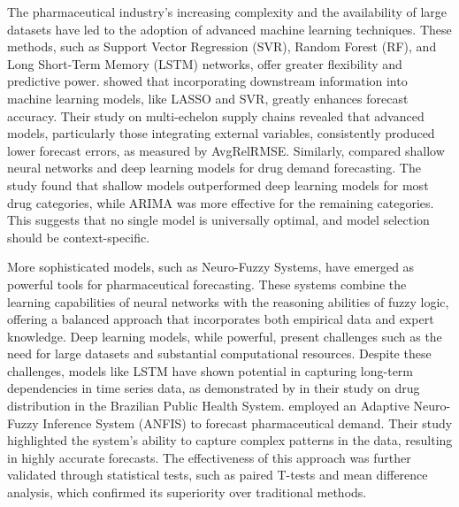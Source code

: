\documentclass[
  authoryear,
  preprint,
  3p]{elsarticle}
\begin{document}
The pharmaceutical industry's increasing complexity and the availability
of large datasets have led to the adoption of advanced machine learning
techniques. These methods, such as Support Vector Regression (SVR),
Random Forest (RF), and Long Short-Term Memory (LSTM) networks, offer
greater flexibility and predictive power. \citet{van2021using} showed
that incorporating downstream information into machine learning models,
like LASSO and SVR, greatly enhances forecast accuracy. Their study on
multi-echelon supply chains revealed that advanced models, particularly
those integrating external variables, consistently produced lower
forecast errors, as measured by AvgRelRMSE. Similarly,
\citet{rathipriya2023demand} compared shallow neural networks and deep
learning models for drug demand forecasting. The study found that
shallow models outperformed deep learning models for most drug
categories, while ARIMA was more effective for the remaining categories.
This suggests that no single model is universally optimal, and model
selection should be context-specific.

More sophisticated models, such as Neuro-Fuzzy Systems, have emerged as
powerful tools for pharmaceutical forecasting. These systems combine the
learning capabilities of neural networks with the reasoning abilities of
fuzzy logic, offering a balanced approach that incorporates both
empirical data and expert knowledge. Deep learning models, while
powerful, present challenges such as the need for large datasets and
substantial computational resources. Despite these challenges, models
like LSTM have shown potential in capturing long-term dependencies in
time series data, as demonstrated by \citet{sousa2019statistical} in
their study on drug distribution in the Brazilian Public Health System.
\citet{candan2014demand} employed an Adaptive Neuro-Fuzzy Inference
System (ANFIS) to forecast pharmaceutical demand. Their study
highlighted the system's ability to capture complex patterns in the
data, resulting in highly accurate forecasts. The effectiveness of this
approach was further validated through statistical tests, such as paired
T-tests and mean difference analysis, which confirmed its superiority
over traditional methods.
\end{document}
